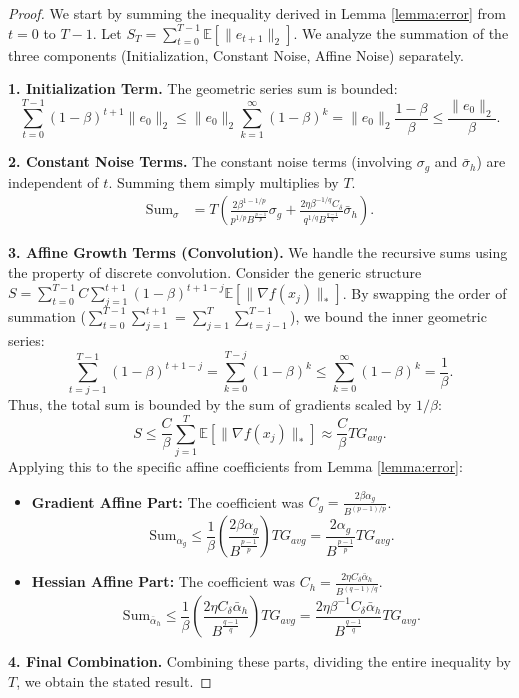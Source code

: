 \documentclass{article}
\theoremstyle{plain}
\theoremstyle{definition}
\theoremstyle{remark}
\begin{document}
\begin{proof}
We start by summing the inequality derived in Lemma \ref{lemma:error} from $t=0$ to $T-1$. Let $S_T = \sum_{t=0}^{T-1} \mathbb{E}[\|e_{t+1}\|_2]$.
We analyze the summation of the three components (Initialization, Constant Noise, Affine Noise) separately.

\textbf{1. Initialization Term.}
The geometric series sum is bounded:
$$ \sum_{t=0}^{T-1} (1-\beta)^{t+1} \|e_0\|_2 \le \|e_0\|_2 \sum_{k=1}^{\infty} (1-\beta)^k = \|e_0\|_2 \frac{1-\beta}{\beta} \le \frac{\|e_0\|_2}{\beta}. $$

\textbf{2. Constant Noise Terms.}
The constant noise terms (involving $\sigma_g$ and $\bar{\sigma}_h$) are independent of $t$. Summing them simply multiplies by $T$.
\begin{align*}
    \text{Sum}_{\sigma} &= T \left( \frac{2 \beta^{1 - 1/p}}{p^{1/p} B^{\frac{p-1}{p}}} \sigma_g + \frac{2 \eta \beta^{-1/q} C_\delta}{q^{1/q} B^{\frac{q-1}{q}}} \bar{\sigma}_h \right).
\end{align*}

\textbf{3. Affine Growth Terms (Convolution).}
We handle the recursive sums using the property of discrete convolution. Consider the generic structure $S = \sum_{t=0}^{T-1} C \sum_{j=1}^{t+1} (1-\beta)^{t+1-j} \mathbb{E}[\|\nabla f(x_j)\|_*]$.
By swapping the order of summation ($\sum_{t=0}^{T-1} \sum_{j=1}^{t+1} = \sum_{j=1}^{T} \sum_{t=j-1}^{T-1}$), we bound the inner geometric series:
$$ \sum_{t=j-1}^{T-1} (1-\beta)^{t+1-j} = \sum_{k=0}^{T-j} (1-\beta)^k \le \sum_{k=0}^{\infty} (1-\beta)^k = \frac{1}{\beta}. $$
Thus, the total sum is bounded by the sum of gradients scaled by $1/\beta$:
$$ S \le \frac{C}{\beta} \sum_{j=1}^{T} \mathbb{E}[\|\nabla f(x_j)\|_*] \approx \frac{C}{\beta} T G_{avg}. $$
Applying this to the specific affine coefficients from Lemma \ref{lemma:error}:
\begin{itemize}
    \item \textbf{Gradient Affine Part:} The coefficient was $C_g = \frac{2 \beta \alpha_g}{B^{(p-1)/p}}$.
    $$ \text{Sum}_{\alpha_g} \le \frac{1}{\beta} \left( \frac{2 \beta \alpha_g}{B^{\frac{p-1}{p}}} \right) T G_{avg} = \frac{2 \alpha_g}{B^{\frac{p-1}{p}}} T G_{avg}. $$
    \item \textbf{Hessian Affine Part:} The coefficient was $C_h = \frac{2 \eta C_\delta \bar{\alpha}_h}{B^{(q-1)/q}}$.
    $$ \text{Sum}_{\bar{\alpha}_h} \le \frac{1}{\beta} \left( \frac{2 \eta C_\delta \bar{\alpha}_h}{B^{\frac{q-1}{q}}} \right) T G_{avg} = \frac{2 \eta \beta^{-1} C_\delta \bar{\alpha}_h}{B^{\frac{q-1}{q}}} T G_{avg}. $$
\end{itemize}

\textbf{4. Final Combination.}
Combining these parts, dividing the entire inequality by $T$, we obtain the stated result.
\end{proof}
\end{document}
